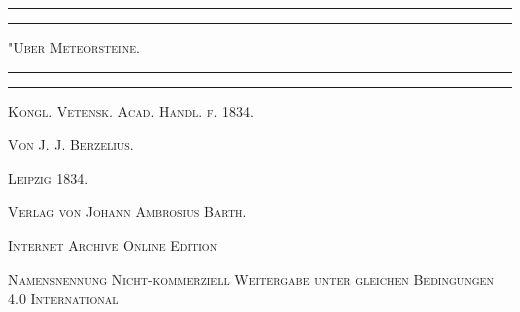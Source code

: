 \documentclass[a4paper, 11pt, oneside]{article}
\begin{document}
\frakfamily
\renewcommand{\contentsname}{
\frakfamily{Inhaltsverzeichnis}
}

\renewcommand{\cftsecfont}{\frakfamily}
\renewcommand{\cftsubsecfont}{\frakfamily}
\renewcommand{\cftsubsubsecfont}{\frakfamily}

\renewcommand\thefootnote{\frakfamily{\arabic{footnote}}}

\begin{titlepage} %
	\centering %

	
	\rule{\textwidth}{1.6pt}\vspace*{-\baselineskip}\vspace*{2pt} %
	\rule{\textwidth}{0.4pt} %
	
	\vspace{1\baselineskip} %
	
	{\scshape\Huge "Uber Meteorsteine.\\[1.25pt]}
	
	\vspace{1\baselineskip} %

	\rule{\textwidth}{0.4pt}\vspace*{-\baselineskip}\vspace{3.2pt} %
	\rule{\textwidth}{1.6pt} %
	
	\vspace{1\baselineskip} %
	
	
	{\Large\scshape Kongl. Vetensk. Acad. Handl. f. 1834.} %
	
	\vspace*{1\baselineskip} %
	
    {\scshape\Large Von J. J. Berzelius.} %
    
    \vspace*{\fill}

	\vspace{1\baselineskip}

	{\Large\scshape Leipzig 1834.}
	
	{\Large\scshape{Verlag von Johann Ambrosius Barth.}}
	
	\vspace{0.5\baselineskip} %

    \scshape\Large Internet Archive Online Edition  %
	
	{\scshape\Large Namensnennung Nicht-kommerziell Weitergabe unter gleichen Bedingungen 4.0 International} %
\end{titlepage}
\end{document}
